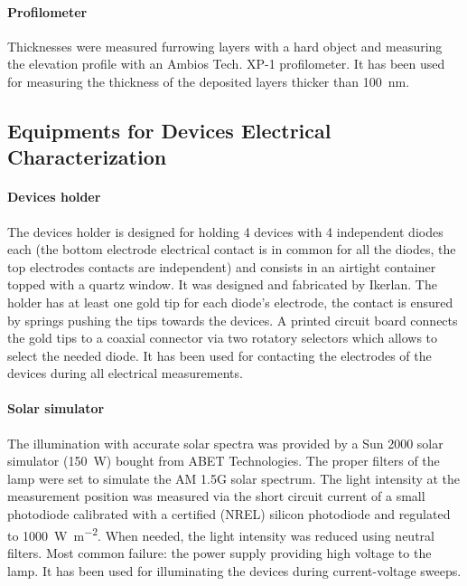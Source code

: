 \paragraph{Profilometer} Thicknesses were measured furrowing layers with a hard object and measuring the elevation profile with an Ambios Tech. XP-1 profilometer.
It has been used for measuring the thickness of the deposited layers thicker than \SI{100}{\nm}.

\subsection{Equipments for Devices Electrical Characterization}

\paragraph{Devices holder} The devices holder is designed for holding 4 devices with 4 independent diodes each (the bottom electrode electrical contact is in common for all the diodes, the top electrodes contacts are independent) and consists in an airtight container topped with a quartz window. It was designed and fabricated by Ikerlan. The holder has at least one gold tip for each diode's electrode, the contact is ensured by springs pushing the tips towards the devices. A printed circuit board connects the gold tips to a coaxial connector via two rotatory selectors which allows to select the needed diode.
It has been used for contacting the electrodes of the devices during all electrical measurements.

\paragraph{Solar simulator}\label{solarsimulator} The illumination with accurate solar spectra was provided by a Sun 2000 solar simulator (\SI{150}{\W}) bought from ABET Technologies. The proper filters of the lamp were set to simulate the AM 1.5G solar spectrum. The light intensity at the measurement position was measured via the short circuit current of a small photodiode calibrated with a certified (NREL) silicon photodiode and regulated to \SI{1000}{\W\per\m\squared}. When needed, the light intensity was reduced using neutral filters.
Most common failure: the power supply providing high voltage to the lamp.
It has been used for illuminating the devices during current-voltage sweeps.

